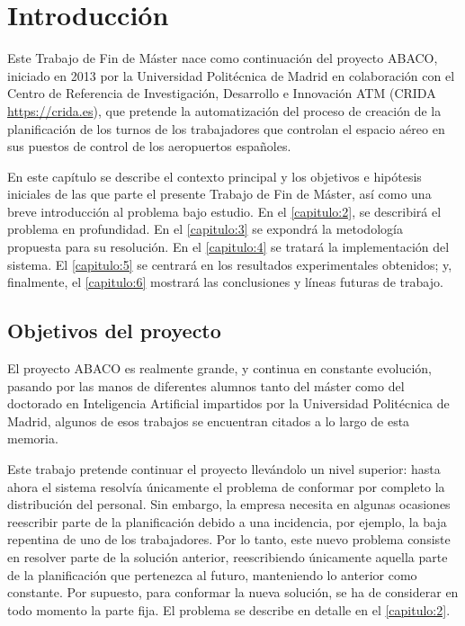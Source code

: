 \graphicspath{{capitulos/Capitulo1-Introduccion/recursos/}}


\section{Introducción}

Este Trabajo de Fin de Máster nace como continuación del proyecto ABACO, iniciado en 2013 por la Universidad Politécnica de Madrid en
colaboración con el Centro de Referencia de Investigación, Desarrollo e Innovación ATM (CRIDA \url{https://crida.es}), que pretende la
automatización del proceso de creación de la planificación de los turnos de los trabajadores que controlan el espacio 
aéreo en sus puestos de control de los aeropuertos españoles.

En este capítulo se describe el contexto principal y los objetivos e hipótesis iniciales de las que parte el presente Trabajo de Fin de Máster, así como una breve introducción al problema bajo estudio.
En el \autoref{capitulo:2}, se describirá el problema en profundidad. En el \autoref{capitulo:3} se expondrá la metodología propuesta para su resolución. En el \autoref{capitulo:4} se tratará la implementación del sistema.
El \autoref{capitulo:5} se centrará en los resultados experimentales obtenidos; y, finalmente, el \autoref{capitulo:6} mostrará las conclusiones y líneas futuras de trabajo.

\subsection{Objetivos del proyecto}
\label{sec:Objectivos}
El proyecto \gls{ABACO} es realmente grande, y continua en constante evolución, pasando por las manos de 
diferentes alumnos tanto del máster como del doctorado en Inteligencia Artificial impartidos por la Universidad Politécnica de Madrid, algunos de esos trabajos se encuentran citados a lo largo de esta memoria. 

Este trabajo pretende continuar el proyecto llevándolo un nivel superior: hasta ahora el sistema resolvía únicamente el problema de conformar por completo la distribución del personal. 
Sin embargo, la empresa necesita en algunas ocasiones reescribir parte de la planificación debido a una incidencia, por ejemplo, la baja repentina de uno de los trabajadores. Por lo tanto, este nuevo problema consiste en resolver parte de la solución anterior, reescribiendo únicamente aquella parte de la planificación que pertenezca al futuro, manteniendo lo anterior como constante. 
Por supuesto, para conformar la nueva solución, se ha de considerar en todo momento la parte fija. El problema se describe en detalle en el \autoref{capitulo:2}.

